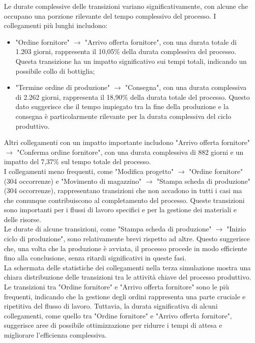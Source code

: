 \documentclass{article}
\begin{document}
Le durate complessive delle transizioni variano significativamente, con alcune che occupano una porzione rilevante del tempo complessivo del processo. I collegamenti più lunghi includono:
\begin{itemize}
    \item "Ordine fornitore" $\rightarrow$ "Arrivo offerta fornitore", con una durata totale di 1.203 giorni, rappresenta il 10,05\% della durata complessiva del processo. Questa transizione ha un impatto significativo sui tempi totali, indicando un possibile collo di bottiglia;
    \item "Termine ordine di produzione" $\rightarrow$ "Consegna", con una durata complessiva di 2.262 giorni, rappresenta il 18,90\% della durata totale del processo. Questo dato suggerisce che il tempo impiegato tra la fine della produzione e la consegna è particolarmente rilevante per la durata complessiva del ciclo produttivo.
\end{itemize}
Altri collegamenti con un impatto importante includono "Arrivo offerta fornitore" $\rightarrow$ "Conferma ordine fornitore", con una durata complessiva di 882 giorni e un impatto del 7,37\% sul tempo totale del processo.\\
I collegamenti meno frequenti, come "Modifica progetto" $\rightarrow$ "Ordine fornitore" (304 occorrenze) e "Movimento di magazzino" $\rightarrow$ "Stampa scheda di produzione" (304 occorrenze), rappresentano transizioni che non accadono in tutti i casi ma che comunque contribuiscono al completamento del processo. Queste transizioni sono importanti per i flussi di lavoro specifici e per la gestione dei materiali e delle risorse.\\
Le durate di alcune transizioni, come "Stampa scheda di produzione" $\rightarrow$ "Inizio ciclo di produzione", sono relativamente brevi rispetto ad altre. Questo suggerisce che, una volta che la produzione è avviata, il processo procede in modo efficiente fino alla conclusione, senza ritardi significativi in queste fasi.\\
La schermata delle statistiche dei collegamenti nella terza simulazione mostra una chiara distribuzione delle transizioni tra le attività chiave del processo produttivo. Le transizioni tra "Ordine fornitore" e "Arrivo offerta fornitore" sono le più frequenti, indicando che la gestione degli ordini rappresenta una parte cruciale e ripetitiva del flusso di lavoro. Tuttavia, la durata significativa di alcuni collegamenti, come quello tra "Ordine fornitore" e "Arrivo offerta fornitore", suggerisce aree di possibile ottimizzazione per ridurre i tempi di attesa e migliorare l'efficienza complessiva.
\end{document}

